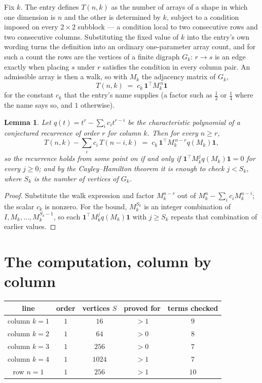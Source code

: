 \documentclass[11pt,a4paper]{article}
\theoremstyle{plain}
\newtheorem{lemma}[theorem]{Lemma}
\theoremstyle{definition}
\begin{document}
Fix $k$. The entry defines $T(n,k)$ as the number of arrays of a shape in which one dimension
is $n$ and the other is determined by $k$, subject to a condition imposed on every
$2\times2$ subblock --- a condition local to two consecutive rows and two consecutive columns.
Substituting the fixed value of $k$ into the entry's own wording turns the definition into an
ordinary one-parameter array count, and for such a count the rows are the vertices of a finite
digraph $G_k$: $r\to s$ is an edge exactly when placing $s$ under $r$ satisfies the condition
in every column pair. An admissible array is then a walk, so with $M_k$ the adjacency matrix
of $G_k$,
\[
T(n,k)\;=\;c_k\,\mathbf{1}^{\!\top}M_k^{\,n}\mathbf{1}
\]
for the constant $c_k$ that the entry's name supplies (a factor such as $\tfrac12$ or
$\tfrac14$ where the name says so, and $1$ otherwise).

\begin{lemma}\label{lem:crit}
Let $q(t)=t^{r}-\sum_i c_it^{r-i}$ be the characteristic polynomial of a conjectured
recurrence of order $r$ for column $k$. Then for every $n\ge r$,
\[
T(n,k)-\sum_i c_i\,T(n-i,k)\;=\;c_k\,\mathbf{1}^{\!\top}M_k^{\,n-r}q(M_k)\mathbf{1},
\]
so the recurrence holds from some point on if and only if
$\mathbf{1}^{\!\top}M_k^{j}q(M_k)\mathbf{1}=0$ for every $j\ge0$; and by the
Cayley--Hamilton theorem it is enough to check $j<S_k$, where $S_k$ is the number of vertices
of $G_k$.
\end{lemma}

\begin{proof}
Substitute the walk expression and factor $M_k^{n-r}$ out of $M_k^{n}-\sum_ic_iM_k^{n-i}$;
the scalar $c_k$ is nonzero. For the bound, $M_k^{S_k}$ is an integer combination of
$I,M_k,\dots,M_k^{S_k-1}$, so each $\mathbf{1}^{\!\top}M_k^{j}q(M_k)\mathbf{1}$ with
$j\ge S_k$ repeats that combination of earlier values.
\end{proof}

\section{The computation, column by column}

\begin{center}
\begin{tabular}{ccccc}
line & order & vertices $S$ & proved for & terms checked \\ \hline
column $k$$=1$ & $1$ & $16$ & $>1$ & $9$ \\
column $k$$=2$ & $1$ & $64$ & $>0$ & $8$ \\
column $k$$=3$ & $1$ & $256$ & $>0$ & $7$ \\
column $k$$=4$ & $1$ & $1024$ & $>1$ & $7$ \\
row $n$$=1$ & $1$ & $256$ & $>1$ & $10$ \\
\end{tabular}
\end{center}
\end{document}
